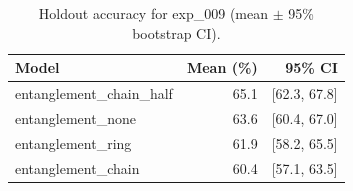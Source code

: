 \begin{table}[ht]
\centering
\caption{Holdout accuracy for exp_009 (mean $\pm$ 95\% bootstrap CI).}
\label{tab:exp_009}
\begin{tabular}{lrr}
\toprule
Model & Mean (\%) & 95\% CI \\
\midrule
entanglement\_chain\_half & 65.1 & [62.3, 67.8] \\
entanglement\_none & 63.6 & [60.4, 67.0] \\
entanglement\_ring & 61.9 & [58.2, 65.5] \\
entanglement\_chain & 60.4 & [57.1, 63.5] \\
\bottomrule
\end{tabular}
\end{table}
